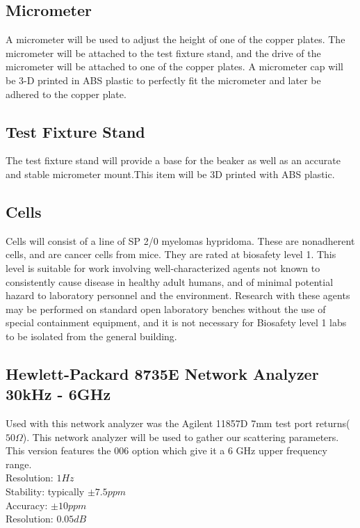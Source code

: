 \documentclass[journal]{IEEEtran}
\begin{document}
\subsection{Micrometer}
A micrometer will be used to adjust the height of one of the copper plates. The micrometer will be attached to the test fixture stand, and the drive of the micrometer will be attached to one of the copper plates. A micrometer cap will be 3-D printed in ABS plastic to perfectly fit the micrometer and later be adhered to the copper plate.

\subsection{Test Fixture Stand}
The test fixture stand will provide a base for the beaker as well as an accurate and stable micrometer mount.This item will be 3D printed with ABS plastic.

\subsection{Cells}
Cells will consist of a line of SP 2/0 myelomas hypridoma. These are nonadherent cells, and are cancer cells from mice.\cite{mouse-myeloma-hybridoma-strain} They are rated at biosafety level 1. This level is suitable for work involving well-characterized agents not known to consistently cause disease in healthy adult humans, and of minimal potential hazard to laboratory personnel and the environment. Research with these agents may be performed on standard open laboratory benches without the use of special containment equipment, and it is not necessary for Biosafety level 1 labs to be isolated from the general building.\cite{biosafety-levels}

\subsection{Hewlett-Packard 8735E Network Analyzer 30kHz - 6GHz}
Used with this network analyzer was the Agilent 11857D 7mm test port returns($50\Omega$). This network analyzer will be used to gather our scattering parameters. This version features the 006 option which give it a 6 GHz upper frequency range.\\
Resolution: $1 Hz$ \\
Stability: typically $\pm7.5 ppm$ \\
Accuracy: $\pm10 ppm$\\
Resolution: $0.05 dB$
\end{document}
